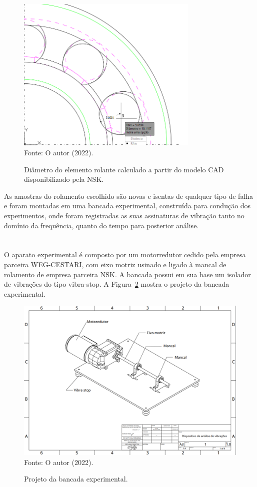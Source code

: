\documentclass[
	12pt,				
	oneside,			
	a4paper,			
	english,			
	brazil,			
	]{abntex2ppgsi}
\begin{document}
\begin{figure}[H]
\centering
\caption {Diâmetro do elemento rolante calculado a partir do modelo CAD disponibilizado pela NSK.}
\includegraphics[width=\textwidth,height=75mm,keepaspectratio]{diametro_rolamento} \\
Fonte: O autor (2022).
\label{diametro_rolamento}
\end{figure} 

As amostras do rolamento escolhido são novas e isentas de qualquer tipo de falha e foram montadas em uma bancada experimental, construída para condução dos experimentos, onde foram registradas as suas assinaturas de vibração tanto no domínio da frequência, quanto do tempo para posterior análise. 

\section{}

O aparato experimental é composto por um motorredutor cedido pela empresa parceira WEG-CESTARI, com eixo motriz usinado e ligado à mancal de rolamento de empresa parceira NSK. A bancada possui em sua base um isolador de vibrações do tipo vibra-stop. A Figura~\ref{Figura22} mostra o projeto da bancada experimental. 

\begin{figure}[H]
\centering
\caption {Projeto da bancada experimental.}
\includegraphics[width=\textwidth,height=\textheight,keepaspectratio]{Figura22} \\
Fonte: O autor (2022).
\label{Figura22}
\end{figure}
\end{document}
